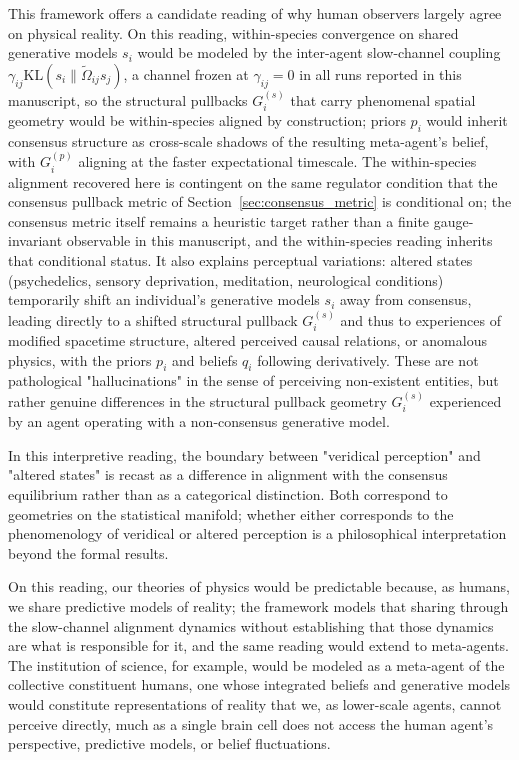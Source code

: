 \documentclass[11pt]{article}
\begin{document}
This framework offers a candidate reading of why human observers largely agree
on physical reality. On this reading, within-species convergence on shared generative models $s_i$ would be modeled by the inter-agent slow-channel coupling $\gamma_{ij}\mathrm{KL}(s_i\|\tilde\Omega_{ij}s_j)$, a channel frozen at $\gamma_{ij} = 0$ in all runs reported in this manuscript, so the structural pullbacks $G^{(s)}_i$ that carry phenomenal spatial geometry would be within-species aligned by construction; priors $p_i$ would inherit consensus structure as cross-scale shadows of the resulting meta-agent's belief, with $G^{(p)}_i$ aligning at the faster expectational timescale. The within-species alignment recovered here is contingent on the same regulator condition that the consensus pullback metric of Section~\ref{sec:consensus_metric} is conditional on; the consensus metric itself remains a heuristic target rather than a finite gauge-invariant observable in this manuscript, and the within-species reading inherits that conditional status. It also explains perceptual variations: altered states (psychedelics, sensory deprivation, meditation, neurological conditions) temporarily shift an individual's generative models $s_i$ away from consensus, leading directly to a shifted structural pullback $G^{(s)}_i$ and thus to experiences of modified spacetime structure, altered perceived causal relations, or anomalous physics, with the priors $p_i$ and beliefs $q_i$ following derivatively. These are not pathological "hallucinations" in the sense of perceiving non-existent entities, but rather genuine differences in the structural pullback geometry $G^{(s)}_i$ experienced by an agent operating with a non-consensus generative model.

In this interpretive reading, the boundary between "veridical perception" and "altered states" is recast as a difference in alignment with the consensus equilibrium rather than as a categorical distinction. Both correspond to geometries on the statistical manifold; whether either corresponds to the phenomenology of veridical or altered perception is a philosophical interpretation beyond the formal results.

On this reading, our theories of physics would be predictable because, as humans, we share predictive models of reality; the framework models that sharing through the slow-channel alignment dynamics without establishing that those dynamics are what is responsible for it, and the same reading would extend to meta-agents. The institution of science, for example, would be modeled as a meta-agent of the collective constituent humans, one whose integrated beliefs and generative models would constitute representations of reality that we, as lower-scale agents, cannot perceive directly, much as a single brain cell does not access the human agent's perspective, predictive models, or belief fluctuations.
\end{document}
